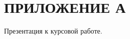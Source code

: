 \documentclass{bmstu}
\begin{document}
% 












\chapter*{\centering ПРИЛОЖЕНИЕ А}

Презентация к курсовой работе.
\end{document}
